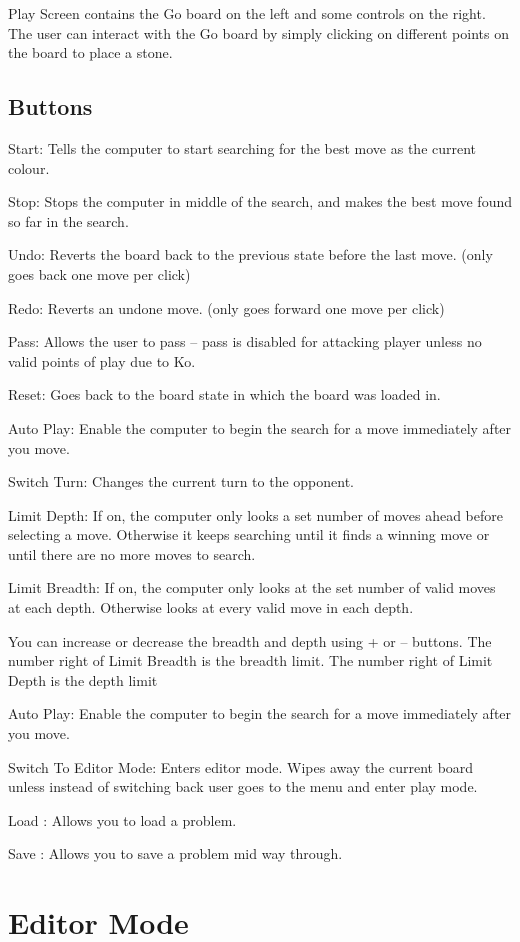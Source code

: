\documentclass{l4proj}
\begin{document}
\begin{appendices}
Play Screen contains the Go board on the left and some controls on the right. The user can interact with the Go board by simply clicking on different points on the board to place a stone.
\subsection{Buttons}

Start: Tells the computer to start searching for the best move as the current colour.

Stop: Stops the computer in middle of the search, and makes the best move found so far in the search.

Undo: Reverts the board back to the previous state before the last move. (only goes back one move per click)

Redo: Reverts an undone move. (only goes forward one move per click)

Pass: Allows the user to pass – pass is disabled for attacking player unless no valid points of play due to Ko.

Reset: Goes back to the board state in which the board was loaded in.

Auto Play: Enable the computer to begin the search for a move immediately after you move.

Switch Turn: Changes the current turn to the opponent.


Limit Depth: If on, the computer only looks a set number of moves ahead before selecting a move. Otherwise it keeps searching until it finds a winning move or until there are no more moves to search.

Limit Breadth: If on, the computer only looks at the set number of valid moves at each depth. Otherwise looks at every valid move in each depth.


You can increase or decrease the breadth and depth using + or – buttons.
The number right of Limit Breadth is the breadth limit.
The number right of Limit Depth is the depth limit

Auto Play: Enable the computer to begin the search for a move immediately after you move.

Switch To Editor Mode: Enters editor mode. Wipes away the current board unless instead of switching back user goes to the menu and enter play mode.


Load : Allows you to load a problem.

Save : Allows you to save a problem mid way through.


\section{Editor Mode}


\end{appendices}
\end{document}
